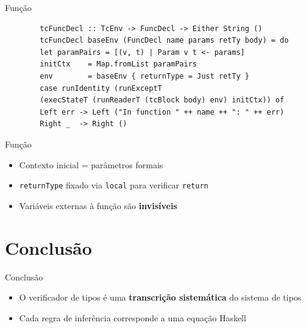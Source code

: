 \begin{frame}[fragile]{Função}

    \begin{lstlisting}
        tcFuncDecl :: TcEnv -> FuncDecl -> Either String ()
        tcFuncDecl baseEnv (FuncDecl name params retTy body) = do
        let paramPairs = [(v, t) | Param v t <- params]
        initCtx    = Map.fromList paramPairs
        env        = baseEnv { returnType = Just retTy }
        case runIdentity (runExceptT
        (execStateT (runReaderT (tcBlock body) env) initCtx)) of
        Left err -> Left ("In function " ++ name ++ ": " ++ err)
        Right _  -> Right ()
    \end{lstlisting}
\end{frame}

\begin{frame}[fragile]{Função}

    \begin{itemize}

        \item
        Contexto inicial = parâmetros formais
        \item
        \texttt{returnType} fixado via
        \texttt{local} para verificar
        \texttt{return}
        \item
        Variáveis externas à função são \textbf{invisíveis}
    \end{itemize}
\end{frame}


\section{Conclusão}\label{conclusuxe3o}

\begin{frame}{Conclusão}

    \begin{itemize}

        \item
        O verificador de tipos é uma \textbf{transcrição sistemática} do
        sistema de tipos
        \item
        Cada regra de inferência corresponde a uma equação Haskell
    \end{itemize}
\end{frame}
